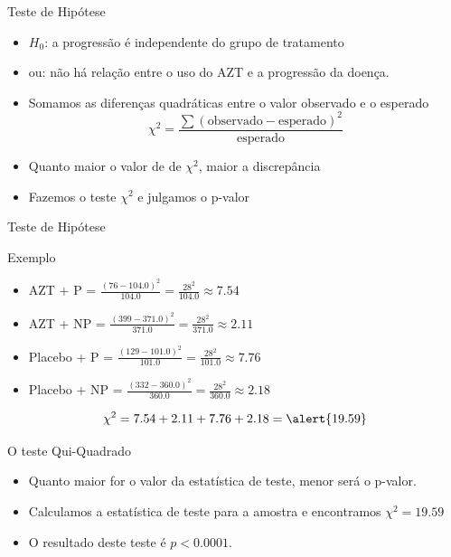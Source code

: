 \documentclass{beamer}
\begin{document}
\begin{frame}{\scriptsize Teste de Hipótese}
  \begin{itemize}
    \small
  \item $H_0$: a progressão é independente do grupo de tratamento
  \item ou: não há relação entre o uso do AZT e a progressão da doença.
    \bigskip
    \scriptsize
  \item Somamos as diferenças quadráticas entre o valor observado
    e o esperado
    \begin{displaymath}
      \chi^2 = \frac{\sum (\text{observado} - \text{esperado})^2 }{\text{esperado}}
    \end{displaymath}
    \bigskip
    \footnotesize
  \item Quanto maior o valor de de $\chi^2$, maior a discrepância
  \item Fazemos o teste $\chi^2$ e julgamos o p-valor
  \end{itemize}
\end{frame}

\begin{frame}{\scriptsize Teste de Hipótese}
  \begin{exampleblock}{Exemplo}
    \footnotesize
    \begin{itemize}
      \scriptsize
    \item AZT + P = $\frac{(76 - 104.0)^2}{104.0} = \frac{28^2}{104.0}
      \approx 7.54$
    \item AZT + NP = $\frac{(399 - 371.0)^2}{371.0} =
      \frac{28^2}{371.0} \approx 2.11$
    \item Placebo + P = $\frac{(129 - 101.0)^2}{101.0} =
      \frac{28^2}{101.0} \approx 7.76$
    \item Placebo + NP = $\frac{(332 - 360.0)^2}{360.0} =
      \frac{28^2}{360.0} \approx 2.18$
    \end{itemize}
    \small
    \bigskip
    \begin{exampleblock}{}
    \footnotesize
      $$\chi^2 = 7.54 + 2.11 + 7.76 + 2.18 = \alert{19.59}$$
    \end{exampleblock}
  \end{exampleblock}
\end{frame}

\begin{frame}{\scriptsize O teste Qui-Quadrado}
  \begin{itemize}
    \small
  \item Quanto \alert{maior} for o valor da estatística de teste,
    \alert{menor} será o p-valor.
  \item Calculamos a estatística de teste para a amostra e encontramos
    $\chi^2 = 19.59$
  \item O resultado deste teste é $p<0.0001$.
  \end{itemize}
\end{frame}
\end{document}
